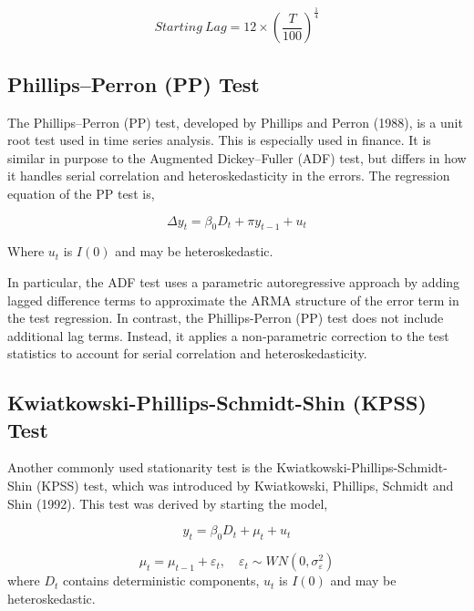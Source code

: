 \documentclass[12pt]{article}
\begin{document}
	\[
		Starting\ Lag
		=
		12 \times
		\left(
		\frac{T}{100}
		\right)^{\frac{1}{4}}
	\]

\subsection{Phillips–Perron (PP) Test}

The Phillips--Perron (PP) test, developed by Phillips and Perron (1988), is a unit root test used in time series analysis. This is especially used in finance. It is similar in purpose to the Augmented Dickey--Fuller (ADF) test, but differs in how it handles serial correlation and heteroskedasticity in the errors. The regression equation of the PP test is,

\[
\Delta y_t = \beta_0 D_t + \pi y_{t-1} + u_t
\]

\noindent Where $u_t$ is $I(0)$ and may be heteroskedastic.

\vspace{0.75cm}

In particular, the ADF test uses a parametric autoregressive approach by adding lagged difference terms to approximate the ARMA structure of the error term in the test regression. In contrast, the Phillips-Perron (PP) test does not include additional lag terms. Instead, it applies a non-parametric correction to the test statistics to account for serial correlation and heteroskedasticity.

\subsection{Kwiatkowski-Phillips-Schmidt-Shin (KPSS) Test}

Another commonly used stationarity test is the Kwiatkowski-Phillips-Schmidt-Shin (KPSS) test, which was introduced by Kwiatkowski, Phillips, Schmidt and Shin (1992). This test was derived by starting the model,

\vspace{-0.75cm}

\[
	y_t = \beta_0 D_t + \mu_t + u_t 
\]

\vspace{-1.5cm}

\[	
	\mu_t = \mu_{t-1} + \varepsilon_t, \quad \varepsilon_t \sim WN(0,\sigma^2_{\varepsilon})
\]
where $D_t$ contains deterministic components, $u_t$ is $I(0)$ and may be heteroskedastic.

\vspace{0.75cm}
\end{document}
